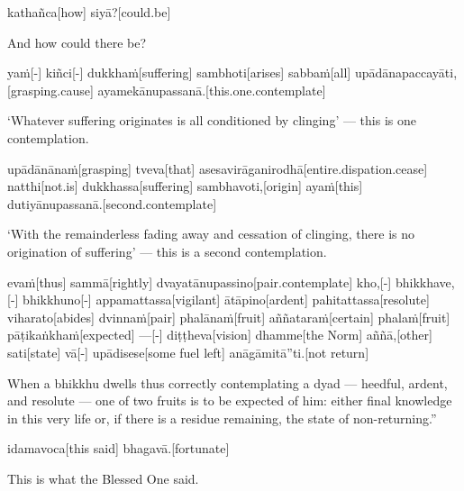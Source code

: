 \begin{samepage}
\begingl[glneveryline={\PaliGlossA,\PaliGlossB}]
kathañca[how] siyā?[could.be]
\endgl
\nopagebreak
\linespread{0.5}
\begin{spacin}{0.2}
{\PaliGlossFT And how could there be?}
\end{spacin}
\vskip 12pt
\end{samepage}
\begin{samepage}
\begingl[glneveryline={\PaliGlossA,\PaliGlossB}]
yaṁ[-] kiñci[-] dukkhaṁ[suffering] sambhoti[arises] sabbaṁ[all] upādānapaccayāti,[grasping.cause] ayamekānupassanā.[this.one.contemplate]
\endgl
\nopagebreak
\linespread{0.5}
\begin{spacin}{0.2}
{\PaliGlossFT ‘Whatever suffering originates is all conditioned by clinging’ — this is one contemplation.}
\end{spacin}
\vskip 12pt
\end{samepage}
\begin{samepage}
\begingl[glneveryline={\PaliGlossA,\PaliGlossB}]
upādānānaṁ[grasping] tveva[that] asesavirāganirodhā[entire.dispation.cease] natthi[not.is] dukkhassa[suffering] sambhavoti,[origin] ayaṁ[this] dutiyānupassanā.[second.contemplate]
\endgl
\nopagebreak
\linespread{0.5}
\begin{spacin}{0.2}
{\PaliGlossFT ‘With the remainderless fading away and cessation of clinging, there is no origination of suffering’ — this is a second contemplation.}
\end{spacin}
\vskip 12pt
\end{samepage}
\begin{samepage}
\begingl[glneveryline={\PaliGlossA,\PaliGlossB}]
evaṁ[thus] sammā[rightly] dvayatānupassino[pair.contemplate] kho,[-] bhikkhave,[-] bhikkhuno[-] appamattassa[vigilant] ātāpino[ardent] pahitattassa[resolute] viharato[abides] dvinnaṁ[pair] phalānaṁ[fruit] aññataraṁ[certain] phalaṁ[fruit] pāṭikaṅkhaṁ[expected] —[-] diṭṭheva[vision] dhamme[the Norm] aññā,[other] sati[state] vā[-] upādisese[some fuel left] anāgāmitā”ti.[not return]
\endgl
\nopagebreak
\linespread{0.5}
\begin{spacin}{0.2}
{\PaliGlossFT When a bhikkhu dwells thus correctly contemplating a dyad — heedful, ardent, and resolute — one of two fruits is to be expected of him: either final knowledge in this very life or, if there is a residue remaining, the state of non-returning.”}
\end{spacin}
\vskip 12pt
\end{samepage}
\begin{samepage}
\begingl[glneveryline={\PaliGlossA,\PaliGlossB}]
idamavoca[this said] bhagavā.[fortunate]
\endgl
\nopagebreak
\linespread{0.5}
\begin{spacin}{0.2}
{\PaliGlossFT This is what the Blessed One said.}
\end{spacin}
\vskip 12pt
\end{samepage}
